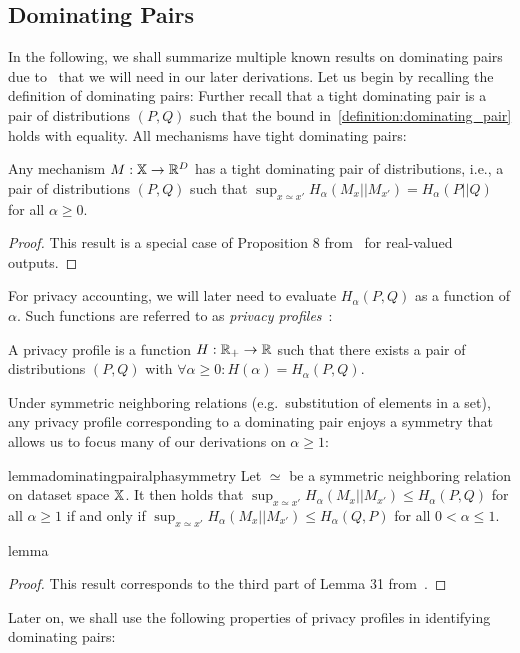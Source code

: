\subsection{Dominating Pairs}
In the following, we shall summarize multiple known results on dominating pairs due to~\citet{zhu2022optimal}
that we will need in our later derivations.
Let us begin by recalling the definition of dominating pairs:
\dominatingpair*
Further recall that a tight dominating pair is a pair of distributions  $(P,Q)$ such that the bound in~\cref{definition:dominating_pair} holds with equality. All mechanisms have tight dominating pairs:
\begin{lemma}
    Any mechanism $M : {\mathbb{X}} \rightarrow {\mathbb{R}}^D$ has a tight dominating pair of distributions, i.e.,
    a pair of distributions $(P,Q)$ such that $\sup_{x \simeq x'} H_\alpha(M_x ||M_{x'}) = H_\alpha(P || Q)$ for all $\alpha \geq 0$.
\end{lemma}
\begin{proof}
    This result is a special case of Proposition 8 from~\cite{zhu2022optimal} for real-valued outputs.
\end{proof}
For privacy accounting, we will later need to evaluate $H_\alpha(P,Q)$ as a function of $\alpha$.
Such functions are referred to as \emph{privacy profiles}~\cite{zhu2022optimal}:
\begin{definition}\label{definition:privacy_profile}
    A privacy profile is a function $H : {\mathbb{R}}_+ \rightarrow {\mathbb{R}}$ such that there exists a pair of distributions $(P,Q)$
    with $\forall \alpha \geq 0: H(\alpha) = H_\alpha(P,Q)$.
\end{definition}
Under symmetric neighboring relations (e.g.\ substitution of elements in a set), any privacy profile corresponding to a dominating pair enjoys a symmetry that allows us to focus many of our derivations on $\alpha \geq 1$:
\begin{restatable}{lemma}{dominatingpairalphasymmetry}\label{lemma:dominating_pair_alpha_symmetry}
    Let $\simeq$ be a symmetric neighboring relation on dataset space ${\mathbb{X}}$.
    It then holds that $\sup_{x \simeq x'} H_\alpha(M_x ||M_{x'}) \leq H_\alpha(P,Q)$ for all $\alpha \geq 1$
    if and only if $\sup_{x \simeq x'} H_\alpha(M_x ||M_{x'}) \leq H_\alpha(Q,P)$ for all $0 < \alpha \leq 1$.
\end{restatable}{lemma}
\begin{proof}
    This result corresponds to the third part of Lemma 31 from~\cite{zhu2022optimal}.
\end{proof}
Later on, we shall use the following properties of privacy profiles in identifying dominating pairs:
